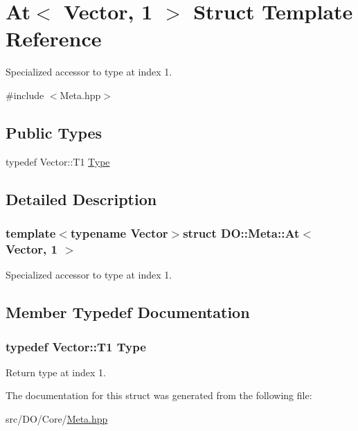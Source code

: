 \hypertarget{struct_d_o_1_1_meta_1_1_at_3_01_vector_00_011_01_4}{\section{At$<$ Vector, 1 $>$ Struct Template Reference}
\label{struct_d_o_1_1_meta_1_1_at_3_01_vector_00_011_01_4}
}


Specialized accessor to type at index 1.  




{\ttfamily \#include $<$Meta.\-hpp$>$}

\subsection*{Public Types}
\begin{DoxyCompactItemize}
\item 
typedef Vector\-::\-T1 \hyperlink{struct_d_o_1_1_meta_1_1_at_3_01_vector_00_011_01_4_aa57a49d6262a171f24855356f2522bff}{Type}
\end{DoxyCompactItemize}


\subsection{Detailed Description}
\subsubsection*{template$<$typename Vector$>$struct D\-O\-::\-Meta\-::\-At$<$ Vector, 1 $>$}

Specialized accessor to type at index 1. 

\subsection{Member Typedef Documentation}
\hypertarget{struct_d_o_1_1_meta_1_1_at_3_01_vector_00_011_01_4_aa57a49d6262a171f24855356f2522bff}{
\subsubsection[{Type}]{\setlength{\rightskip}{0pt plus 5cm}typedef Vector\-::\-T1 {\bf Type}}}\label{struct_d_o_1_1_meta_1_1_at_3_01_vector_00_011_01_4_aa57a49d6262a171f24855356f2522bff}
Return type at index 1. 

The documentation for this struct was generated from the following file\-:\begin{DoxyCompactItemize}
\item 
src/\-D\-O/\-Core/\hyperlink{_meta_8hpp}{Meta.\-hpp}\end{DoxyCompactItemize}
